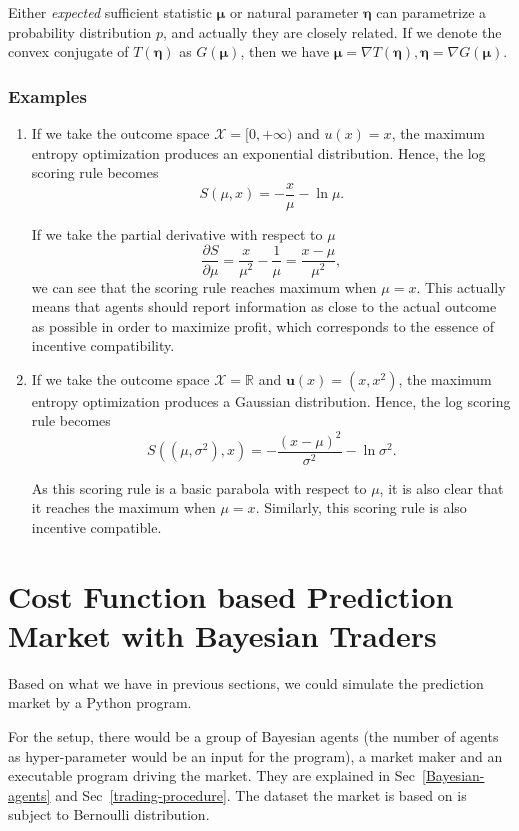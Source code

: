 \documentclass[12pt]{article}
\begin{document}
Either \textit{expected} sufficient statistic $\bm{\mu}$ or natural parameter $\bm{\eta}$ can parametrize a probability distribution $p$, and actually they are closely related. If we denote the convex conjugate of $T(\bm{\eta})$ as $G(\bm{\mu})$, then we have $\bm{\mu}=\nabla T(\bm{\eta}),\bm{\eta}=\nabla G(\bm{\mu})$.
\subsubsection{Examples}
\begin{enumerate}
    \item If we take the outcome space $\mathcal{X}=[0,+\infty)$ and $u(x)=x$, the maximum entropy optimization produces an exponential distribution. Hence, the log scoring rule becomes
          \[S(\mu,x)=-\frac{x}{\mu}-\ln\mu.\]

          If we take the partial derivative with respect to $\mu$
          \[\frac{\partial S}{\partial\mu}=\frac{x}{\mu^2}-\frac{1}{\mu}=\frac{x-\mu}{\mu^2},\]
          we can see that the scoring rule reaches maximum when $\mu=x$. This actually means that agents should report information as close to the actual outcome as possible in order to maximize profit, which corresponds to the essence of incentive compatibility.
    \item If we take the outcome space $\mathcal{X}=\mathbb{R}$ and $\mathbf{u}(x)=(x,x^2)$, the maximum entropy optimization produces a Gaussian distribution. Hence, the log scoring rule becomes
          \[S((\mu,\sigma^2),x)=-\frac{(x-\mu)^2}{\sigma^2}-\ln\sigma^2.\]

          As this scoring rule is a basic parabola with respect to $\mu$, it is also clear that it reaches the maximum when $\mu=x$. Similarly, this scoring rule is also incentive compatible.
\end{enumerate}

\section{Cost Function based Prediction Market with Bayesian Traders}
Based on what we have in previous sections, we could simulate the prediction market by a Python program.

For the setup, there would be a group of Bayesian agents (the number of agents as hyper-parameter would be an input for the program), a market maker and an executable program driving the market. They are explained in Sec~\ref{Bayesian-agents} and Sec~\ref{trading-procedure}. The dataset the market is based on is subject to Bernoulli distribution.
\end{document}
